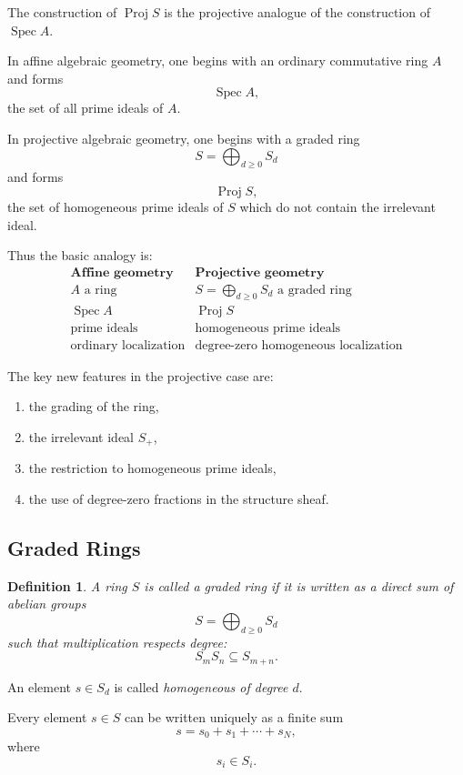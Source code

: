 \documentclass[12pt,a4paper]{article}
\DeclareMathOperator{\Spec}{Spec}
\DeclareMathOperator{\Proj}{Proj}
\theoremstyle{notespace}
\newtheorem{definition}{Definition}[subsection]
\begin{document}
The construction of \(\Proj S\) is the projective analogue of the construction of
\(\Spec A\).

In affine algebraic geometry, one begins with an ordinary commutative ring \(A\) and
forms
\[
\Spec A,
\]
the set of all prime ideals of \(A\).

In projective algebraic geometry, one begins with a graded ring
\[
S=\bigoplus_{d\ge 0}S_d
\]
and forms
\[
\Proj S,
\]
the set of homogeneous prime ideals of \(S\) which do not contain the irrelevant ideal.

Thus the basic analogy is:
\[
\begin{array}{c|c}
	\textbf{Affine geometry} & \textbf{Projective geometry} \\
	\hline
	A \text{ a ring} & S=\bigoplus_{d\ge 0}S_d \text{ a graded ring} \\
	\Spec A & \Proj S \\
	\text{prime ideals} & \text{homogeneous prime ideals} \\
	\text{ordinary localization} & \text{degree-zero homogeneous localization}
\end{array}
\]

The key new features in the projective case are:

\begin{enumerate}
	\item the grading of the ring,
	\item the irrelevant ideal \(S_+\),
	\item the restriction to homogeneous prime ideals,
	\item the use of degree-zero fractions in the structure sheaf.
\end{enumerate}

\subsection{Graded Rings}

\begin{definition}
	A ring \(S\) is called a \emph{graded ring} if it is written as a direct sum of abelian
	groups
	\[
	S=\bigoplus_{d\ge 0}S_d
	\]
	such that multiplication respects degree:
	\[
	S_mS_n\subseteq S_{m+n}.
	\]
\end{definition}

An element \(s\in S_d\) is called \emph{homogeneous of degree \(d\)}.

Every element \(s\in S\) can be written uniquely as a finite sum
\[
s=s_0+s_1+\cdots+s_N,
\]
where
\[
s_i\in S_i.
\]
\end{document}
